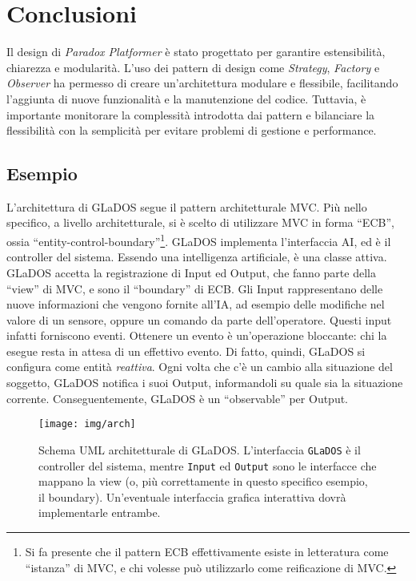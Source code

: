 \documentclass[a4paper,12pt]{report}
\begin{document}
	
	\section{Conclusioni}
	
	Il design di \textit{Paradox Platformer} è stato progettato per garantire estensibilità, chiarezza e modularità. L'uso dei pattern di design come \textit{Strategy}, \textit{Factory} e \textit{Observer} ha permesso di creare un'architettura modulare e flessibile, facilitando l'aggiunta di nuove funzionalità e la manutenzione del codice. Tuttavia, è importante monitorare la complessità introdotta dai pattern e bilanciare la flessibilità con la semplicità per evitare problemi di gestione e performance.
	
	
	
	\subsection*{Esempio}
	
	L'architettura di GLaDOS segue il pattern architetturale MVC.
	Più nello specifico, a livello architetturale, si è scelto di utilizzare MVC in forma ``ECB'', ossia ``entity-control-boundary''\footnote{
		Si fa presente che il pattern ECB effettivamente esiste in letteratura come ``istanza'' di MVC, e chi volesse può utilizzarlo come reificazione di MVC.
	}.
	GLaDOS implementa l'interfaccia AI, ed è il controller del sistema.
	Essendo una intelligenza artificiale, è una classe attiva.
	GLaDOS accetta la registrazione di Input ed Output, che fanno parte della ``view'' di MVC, e sono il ``boundary'' di ECB.
	Gli Input rappresentano delle nuove informazioni che vengono fornite all'IA, ad esempio delle modifiche nel valore di un sensore, oppure un comando da parte dell'operatore.
	Questi input infatti forniscono eventi.
	Ottenere un evento è un'operazione bloccante: chi la esegue resta in attesa di un effettivo evento.
	Di fatto, quindi, GLaDOS si configura come entità \textit{reattiva}.
	Ogni volta che c'è un cambio alla situazione del soggetto, GLaDOS notifica i suoi Output,
	informandoli su quale sia la situazione corrente.
	Conseguentemente, GLaDOS è un ``observable'' per Output.
	
	\begin{figure}[h]
		\centering{}
		\texttt{[image: img/arch]}
		\caption{Schema UML architetturale di GLaDOS. L'interfaccia \texttt{GLaDOS} è il controller del sistema, mentre \texttt{Input} ed \texttt{Output} sono le interfacce che mappano la view (o, più correttamente in questo specifico esempio, il boundary). Un'eventuale interfaccia grafica interattiva dovrà implementarle entrambe.}
		\label{img:goodarch}
	\end{figure}
	
\end{document}
